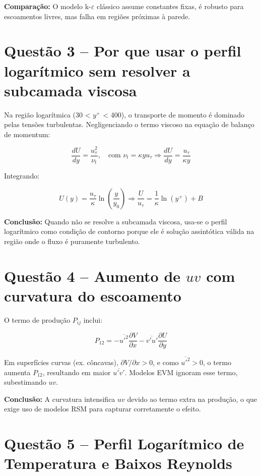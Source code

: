 \documentclass[a4paper,12pt]{article}
\begin{document}
\textbf{Comparação:} O modelo k-$\varepsilon$ clássico assume constantes fixas, é robusto para escoamentos livres, mas falha em regiões próximas à parede.

\section*{Questão 3 – Por que usar o perfil logarítmico sem resolver a subcamada viscosa}

Na região logarítmica (30 < \( y^+ \) < 400), o transporte de momento é dominado pelas tensões turbulentas.  
Negligenciando o termo viscoso na equação de balanço de momentum:

\[
\frac{dU}{dy} = \frac{u_\tau^2}{\nu_t}, \quad \text{com } \nu_t = \kappa y u_\tau
\Rightarrow \frac{dU}{dy} = \frac{u_\tau}{\kappa y}
\]

Integrando:

\[
U(y) = \frac{u_\tau}{\kappa} \ln\left( \frac{y}{y_0} \right) \Rightarrow
\frac{U}{u_\tau} = \frac{1}{\kappa} \ln(y^+) + B
\]

\textbf{Conclusão:} Quando não se resolve a subcamada viscosa, usa-se o perfil logarítmico como condição de contorno porque ele é solução assintótica válida na região onde o fluxo é puramente turbulento.

\section*{Questão 4 – Aumento de \( uv \) com curvatura do escoamento}

O termo de produção \( P_{ij} \) inclui:

\[
P_{12} = -\overline{u'^2} \frac{\partial V}{\partial x} - \overline{v'u'} \frac{\partial U}{\partial y}
\]

Em superfícies curvas (ex. côncavas), \( \partial V/\partial x > 0 \), e como \( \overline{u'^2} > 0 \), o termo aumenta \( P_{12} \), resultando em maior \( \overline{u'v'} \).  
Modelos EVM ignoram esse termo, subestimando \( uv \).

\textbf{Conclusão:} A curvatura intensifica \( uv \) devido ao termo extra na produção, o que exige uso de modelos RSM para capturar corretamente o efeito.

\section*{Questão 5 – Perfil Logarítmico de Temperatura e Baixos Reynolds}
\end{document}
